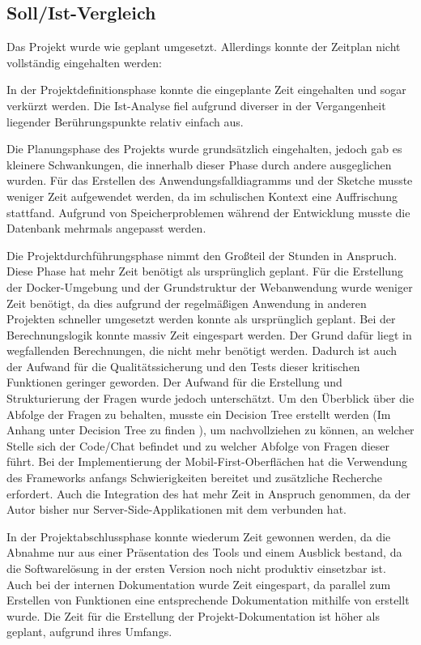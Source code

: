 \subsection{Soll/Ist-Vergleich}
\label{sec:Abschlussphase:Soll/Ist-Vergleich}

Das Projekt wurde wie geplant umgesetzt. Allerdings konnte der Zeitplan nicht vollständig eingehalten werden:

In der Projektdefinitionsphase konnte die eingeplante Zeit eingehalten und sogar verkürzt werden. Die Ist-Analyse fiel aufgrund diverser in der Vergangenheit liegender Berührungspunkte relativ einfach aus.

Die Planungsphase des Projekts wurde grundsätzlich eingehalten, jedoch gab es kleinere Schwankungen, die innerhalb dieser Phase durch andere ausgeglichen wurden. Für das Erstellen des Anwendungsfalldiagramms und der Sketche musste weniger Zeit aufgewendet werden, da im schulischen Kontext eine Auffrischung stattfand. Aufgrund von Speicherproblemen während der Entwicklung musste die Datenbank mehrmals angepasst werden.

Die Projektdurchführungsphase nimmt den Großteil der Stunden in Anspruch. Diese Phase hat mehr Zeit benötigt als ursprünglich geplant. Für die Erstellung der Docker-Umgebung und der Grundstruktur der Webanwendung wurde weniger Zeit benötigt, da dies aufgrund der regelmäßigen Anwendung in anderen Projekten schneller umgesetzt werden konnte als ursprünglich geplant. Bei der Berechnungslogik konnte massiv Zeit eingespart werden. Der Grund dafür liegt in wegfallenden Berechnungen, die nicht mehr benötigt werden. Dadurch ist auch der Aufwand für die Qualitätssicherung und den Tests dieser kritischen Funktionen geringer geworden. Der Aufwand für die Erstellung und Strukturierung der Fragen wurde jedoch unterschätzt. Um den Überblick über die Abfolge der Fragen zu behalten, musste ein Decision Tree erstellt werden (Im Anhang unter Decision Tree zu finden \todo), um nachvollziehen zu können, an welcher Stelle sich der Code/Chat befindet und zu welcher Abfolge von Fragen dieser führt. Bei der Implementierung der Mobil-First-Oberflächen hat die Verwendung des Frameworks  anfangs Schwierigkeiten bereitet und zusätzliche Recherche erfordert. Auch die Integration des  hat mehr Zeit in Anspruch genommen, da der Autor bisher nur Server-Side-Applikationen mit dem  verbunden hat. 

In der Projektabschlussphase konnte wiederum Zeit gewonnen werden, da die Abnahme nur aus einer Präsentation des Tools und einem Ausblick bestand, da die Softwarelösung in der ersten Version noch nicht produktiv einsetzbar ist. Auch bei der internen Dokumentation wurde Zeit eingespart, da parallel zum Erstellen von Funktionen eine entsprechende Dokumentation mithilfe von  erstellt wurde. Die Zeit für die Erstellung der Projekt-Dokumentation ist höher als geplant, aufgrund ihres Umfangs.

